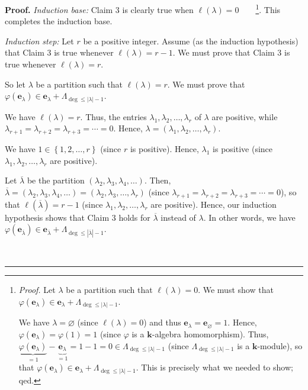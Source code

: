 \documentclass[numbers=enddot,12pt,final,onecolumn,notitlepage]{scrartcl}%
\theoremstyle{definition}
\newenvironment{proof}[1][Proof]{\noindent\textbf{#1.} }{\ \rule{0.5em}{0.5em}}
\begin{document}
\begin{proof}
\textit{Induction base:} Claim 3 is clearly true when $\ell\left(
\lambda\right)  =0$\ \ \ \ \footnote{\textit{Proof.} Let $\lambda$ be a
partition such that $\ell\left(  \lambda\right)  =0$. We must show that
$\varphi\left(  \mathbf{e}_{\lambda}\right)  \in\mathbf{e}_{\lambda}%
+\Lambda_{\deg\leq\left\vert \lambda\right\vert -1}$.
\par
We have $\lambda=\varnothing$ (since $\ell\left(  \lambda\right)  =0$) and
thus $\mathbf{e}_{\lambda}=\mathbf{e}_{\varnothing}=1$. Hence, $\varphi\left(
\mathbf{e}_{\lambda}\right)  =\varphi\left(  1\right)  =1$ (since $\varphi$ is
a $\mathbf{k}$-algebra homomorphism). Thus, $\underbrace{\varphi\left(
\mathbf{e}_{\lambda}\right)  }_{=1}-\underbrace{\mathbf{e}_{\lambda}}%
_{=1}=1-1=0\in\Lambda_{\deg\leq\left\vert \lambda\right\vert -1}$ (since
$\Lambda_{\deg\leq\left\vert \lambda\right\vert -1}$ is a $\mathbf{k}%
$-module), so that $\varphi\left(  \mathbf{e}_{\lambda}\right)  \in
\mathbf{e}_{\lambda}+\Lambda_{\deg\leq\left\vert \lambda\right\vert -1}$. This
is precisely what we needed to show; qed.}. This completes the induction base.

\textit{Induction step:} Let $r$ be a positive integer. Assume (as the
induction hypothesis) that Claim 3 is true whenever $\ell\left(
\lambda\right)  =r-1$. We must prove that Claim 3 is true whenever
$\ell\left(  \lambda\right)  =r$.

So let $\lambda$ be a partition such that $\ell\left(  \lambda\right)  =r$. We
must prove that $\varphi\left(  \mathbf{e}_{\lambda}\right)  \in
\mathbf{e}_{\lambda}+\Lambda_{\deg\leq\left\vert \lambda\right\vert -1}$.

We have $\ell\left(  \lambda\right)  =r$. Thus, the entries $\lambda
_{1},\lambda_{2},\ldots,\lambda_{r}$ of $\lambda$ are positive, while
$\lambda_{r+1}=\lambda_{r+2}=\lambda_{r+3}=\cdots=0$. Hence, $\lambda=\left(
\lambda_{1},\lambda_{2},\ldots,\lambda_{r}\right)  $.

We have $1\in\left\{  1,2,\ldots,r\right\}  $ (since $r$ is positive). Hence,
$\lambda_{1}$ is positive (since $\lambda_{1},\lambda_{2},\ldots,\lambda_{r}$
are positive).

Let $\overline{\lambda}$ be the partition $\left(  \lambda_{2},\lambda
_{3},\lambda_{4},\ldots\right)  $. Then, $\overline{\lambda}=\left(
\lambda_{2},\lambda_{3},\lambda_{4},\ldots\right)  =\left(  \lambda
_{2},\lambda_{3},\ldots,\lambda_{r}\right)  $ (since $\lambda_{r+1}%
=\lambda_{r+2}=\lambda_{r+3}=\cdots=0$), so that $\ell\left(  \overline
{\lambda}\right)  =r-1$ (since $\lambda_{1},\lambda_{2},\ldots,\lambda_{r}$
are positive). Hence, our induction hypothesis shows that Claim 3 holds for
$\overline{\lambda}$ instead of $\lambda$. In other words, we have
$\varphi\left(  \mathbf{e}_{\overline{\lambda}}\right)  \in\mathbf{e}%
_{\overline{\lambda}}+\Lambda_{\deg\leq\left\vert \overline{\lambda
}\right\vert -1}$.


\end{proof}
\end{document}
